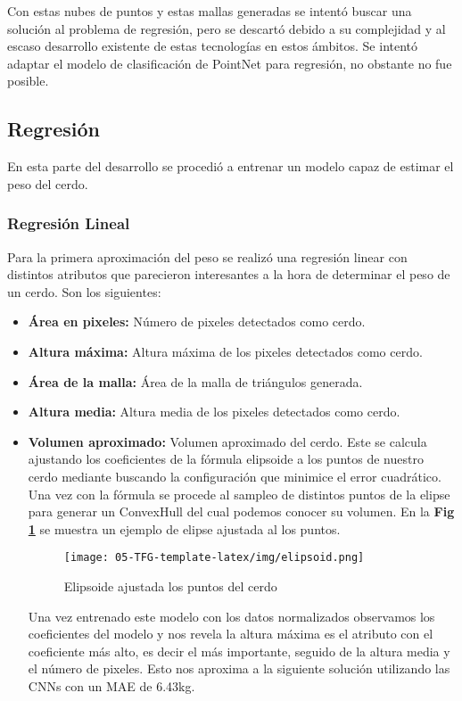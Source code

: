 ﻿\documentclass[10pt,a4paper,twocolumn,twoside]{article}
\begin{document}
    Con estas nubes de puntos y estas mallas generadas se intentó buscar una solución al problema de regresión, pero se descartó debido a su complejidad y al escaso desarrollo existente de estas tecnologías en estos ámbitos. Se intentó adaptar el modelo de clasificación de PointNet\cite{pointnet} para regresión, no obstante no fue posible.
    
    
    
\subsection{Regresión}

En esta parte del desarrollo se procedió a entrenar un modelo capaz de estimar el peso del cerdo.

\subsubsection{Regresión Lineal}
Para la primera aproximación del peso se realizó una regresión linear con distintos atributos que parecieron interesantes a la hora de determinar el peso de un cerdo. Son los siguientes:

\begin{itemize}
\item \textbf{Área en pixeles: }Número de pixeles detectados como cerdo.
\item \textbf{Altura máxima: }Altura máxima de los pixeles detectados como cerdo.
\item \textbf{Área de la malla: }Área de la malla de triángulos generada.
\item \textbf{Altura media: }Altura media de los pixeles detectados como cerdo.
\item \textbf{Volumen aproximado: }Volumen aproximado del cerdo. Este se calcula ajustando los coeficientes de la fórmula elipsoide a los puntos de nuestro cerdo mediante buscando la configuración que minimice el error cuadrático. Una vez con la fórmula se procede al sampleo de distintos puntos de la elipse para generar un ConvexHull del cual podemos conocer su volumen. En la \textbf{Fig \ref{elipsoid}} se muestra un ejemplo de elipse ajustada al los puntos.
    
    \begin{figure}
    \centering
    \texttt{[image: 05-TFG-template-latex/img/elipsoid.png]}
    \caption{Elipsoide ajustada los puntos del cerdo}
    \label{elipsoid}
    \end{figure}
    
    Una vez entrenado este modelo con los datos normalizados observamos los coeficientes del modelo y nos revela la altura máxima es el atributo con el coeficiente más alto, es decir el más importante, seguido de la altura media y el número de pixeles.
    Esto nos aproxima a la siguiente solución utilizando las CNNs con un MAE\cite{mae} de 6.43kg.

\end{itemize}
\end{document}
